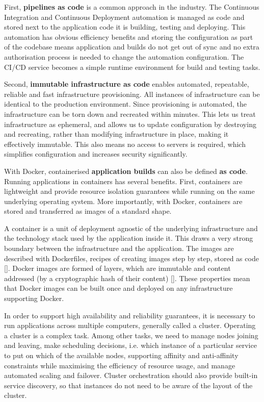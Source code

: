 \documentclass[reprint,amsmath,amssymb,aps]{revtex4-1}
\begin{document}
First, \textbf{pipelines as code} is a common approach in the industry. The Continuous Integration and Continuous Deployment automation is managed as code and stored next to the application code it is building, testing and deploying. This automation has obvious efficiency benefits and storing the configuration as part of the codebase means application and builds do not get out of sync and no extra authorisation process is needed to change the automation configuration. The CI/CD service becomes a simple runtime environment for build and testing tasks.

Second, \textbf{immutable infrastructure as code} enables automated, repeatable, reliable and fast infrastructure provisioning. All instances of infrastructure can be identical to the production environment. Since provisioning is automated, the infrastructure can be torn down and recreated within minutes. This lets us treat infrastructure as ephemeral, and allows us to update configuration by destroying and recreating, rather than modifying infrastructure in place, making it effectively immutable. This also means no access to servers is required, which simplifies configuration and increases security significantly.

With Docker, containerised \textbf{application builds} can also be defined \textbf{as code}. Running applications in containers has several benefits. First, containers are lightweight and provide resource isolation guarantees while running on the same underlying operating system. More importantly, with Docker, containers are stored and transferred as images of a standard shape.

A container is a unit of deployment agnostic of the underlying infrastructure and the technology stack used by the application inside it. This draws a very strong boundary between the infrastructure and the application. The images are described with Dockerfiles, recipes of creating images step by step, stored as code []. Docker images are formed of layers, which are immutable and content addressed (by a cryptographic hash of their content) []. These properties mean that Docker images can be built once and deployed on any infrastructure supporting Docker.

In order to support high availability and reliability guarantees, it is necessary to run applications across multiple computers, generally called a cluster. Operating a cluster is a complex task. Among other tasks, we need to manage nodes joining and leaving, make scheduling decisions, i.e. which instance of a particular service to put on which of the available nodes, supporting affinity and anti-affinity constraints while maximising the efficiency of resource usage, and manage automated scaling and failover. Cluster orchestration should also provide built-in service discovery, so that instances do not need to be aware of the layout of the cluster.
\end{document}
